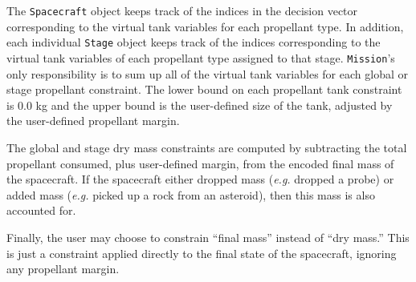 The \texttt{Spacecraft} object keeps track of the indices in the decision vector corresponding to the virtual tank variables for each propellant type. In addition, each individual \texttt{Stage} object keeps track of the indices corresponding to the virtual tank variables of each propellant type assigned to that stage. \texttt{Mission}'s only responsibility is to sum up all of the virtual tank variables for each global or stage propellant constraint. The lower bound on each propellant tank constraint is 0.0 kg and the upper bound is the user-defined size of the tank, adjusted by the user-defined propellant margin.

The global and stage dry mass constraints are computed by subtracting the total propellant consumed, plus user-defined margin, from the encoded final mass of the spacecraft. If the spacecraft either dropped mass (\textit{e.g.} dropped a probe) or added mass (\textit{e.g.} picked up a rock from an asteroid), then this mass is also accounted for.

Finally, the user may choose to constrain ``final mass'' instead of ``dry mass.'' This is just a constraint applied directly to the final state of the spacecraft, ignoring any propellant margin.
